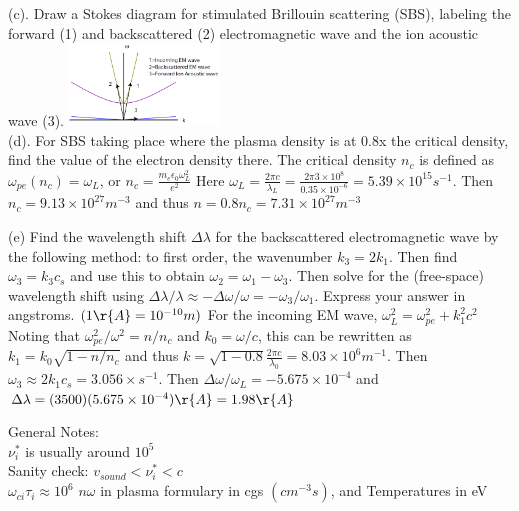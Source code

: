 \documentclass{article}
\begin{document}
\begin{multicols}{3}
(c). Draw a Stokes diagram for stimulated Brillouin scattering (SBS), labeling the forward (1) and backscattered (2) electromagnetic wave and the ion acoustic wave (3).
\includegraphics[width=4cm]{images/SBS_MT2.png}\\

(d). For SBS taking place where the plasma density is at 0.8x the critical density, find the value of the electron density there.
The critical density $n_{c}$ is defined as $\omega_{pe}(n_{c}) = \omega_{L}$, or $n_{c} = \frac{m_{e}\epsilon_{0}\omega_{L}^{2}}{e^{2}}$
Here $\omega_{L} = \frac{2\pi c}{\lambda_{L}} = \frac{2\pi 3\times10^{8}}{0.35\times 10^{-6}} = 5.39\times 10^{15}s^{-1}$. Then $n_{c} = 9.13 \times 10^{27} m^{-3}$ and thus $n = 0.8n_{c} = 7.31\times 10^{27} m^{-3}$

(e) Find the wavelength shift $\Delta \lambda$ for the backscattered electromagnetic wave by the following method: to first order, the wavenumber $k_{3} = 2k_{1}$.  Then find $\omega_{3} = k_{3}c_{s}$ and use this to obtain $\omega_{2} = \omega_{1} - \omega_{3}$. Then solve for the (free-space) wavelength shift using $\Delta \lambda / \lambda \approx - \Delta \omega / \omega = -\omega_{3} / \omega_{1}$.  Express your answer in angstroms. $(1\r{A} = 10^{-10}m)$
For the incoming EM wave, $\omega_{L}^{2} = \omega_{pe}^{2} + k_{1}^{2}c^{2}$
Noting that $\omega_{pe}^{2}/\omega^{2} = n/n_{c	}$ and $k_{0} = \omega/c$, this can be rewritten as $k_{1} = k_{0}\sqrt{1-n/n_{c}}$ and thus $k = \sqrt{1-0.8} \frac{2\pi c}{\lambda_{0}} = 8.03 \times 10^{6} m^{-1}$.  Then $\omega_{3} \approx 2k_{1}c_{s} = 3.056\times s^{-1}$.  Then $\Delta\omega / \omega_{L} = -5.675\times 10^{-4}$ and $\Delta\lambda = (3500)(5.675\times 10^{-4}) \r{A} = 1.98 \r{A}$

General Notes:\\
$\nu_{i}^{*}$ is usually around $10^{5}$\\
Sanity check: $v_{sound}<\nu_{i}^{*}<c$\\
$\omega_{ci}\tau_{i} \approx 10^{6}$
$n\omega$ in plasma formulary in cgs $(cm^{-3}s)$, and Temperatures in eV\\

\end{multicols}
 
\end{document}
